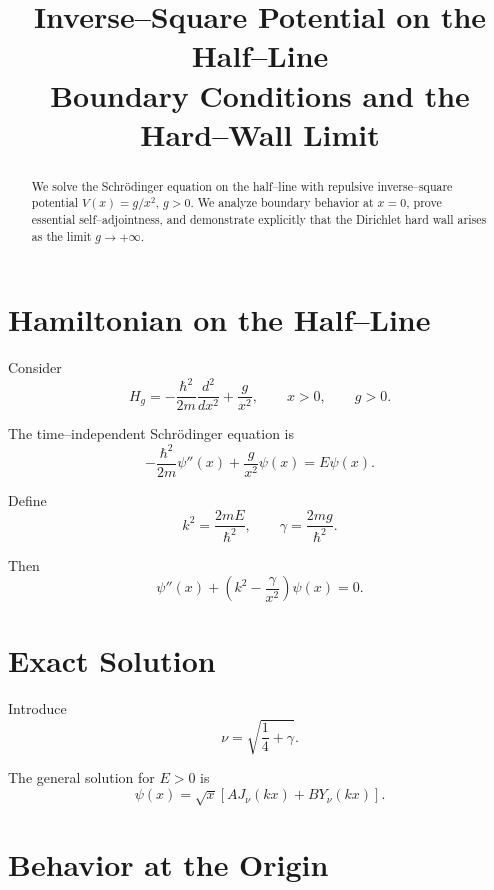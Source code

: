 \documentclass[11pt,a4paper]{article}
\title{\textbf{Inverse--Square Potential on the Half--Line\\
Boundary Conditions and the Hard--Wall Limit}}
\author{}
\date{}
\begin{document}
\maketitle

\begin{abstract}
We solve the Schrödinger equation on the half--line
with repulsive inverse--square potential $V(x)=g/x^2$, $g>0$.
We analyze boundary behavior at $x=0$,
prove essential self--adjointness,
and demonstrate explicitly that the Dirichlet hard wall
arises as the limit $g\to+\infty$.
\end{abstract}

\section{Hamiltonian on the Half--Line}

Consider
\begin{equation}
H_g
=
-\frac{\hbar^2}{2m}\frac{d^2}{dx^2}
+
\frac{g}{x^2},
\qquad x>0,
\qquad g>0.
\end{equation}

The time–independent Schrödinger equation is
\begin{equation}
-\frac{\hbar^2}{2m}\psi''(x)
+
\frac{g}{x^2}\psi(x)
=
E\psi(x).
\end{equation}

Define
\begin{equation}
k^2=\frac{2mE}{\hbar^2},
\qquad
\gamma=\frac{2mg}{\hbar^2}.
\end{equation}

Then
\begin{equation}
\psi''(x)
+
\left(
k^2-\frac{\gamma}{x^2}
\right)\psi(x)=0.
\end{equation}

\section{Exact Solution}

Introduce
\begin{equation}
\nu=\sqrt{\frac{1}{4}+\gamma}.
\end{equation}

The general solution for $E>0$ is
\begin{equation}
\psi(x)
=
\sqrt{x}
\left[
A J_\nu(kx)
+
B Y_\nu(kx)
\right].
\end{equation}

\section{Behavior at the Origin}
\end{document}
